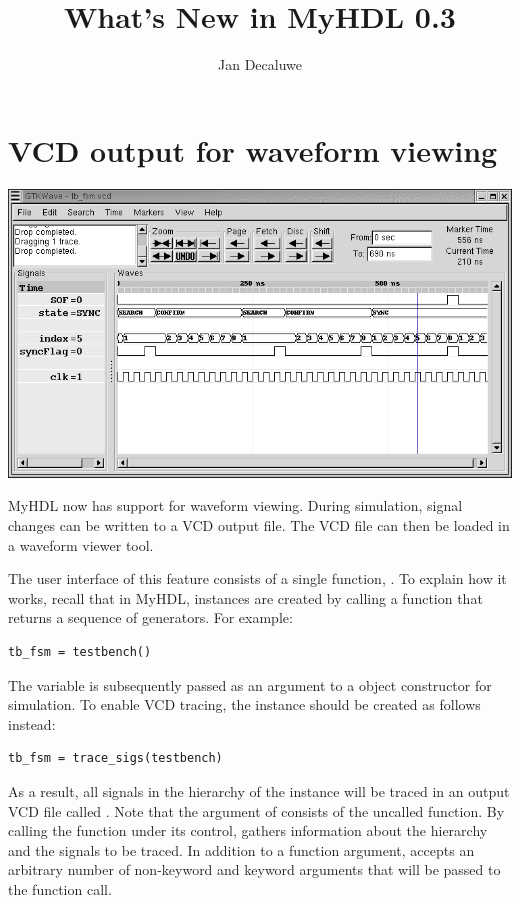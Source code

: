 \documentclass{howto}
\title{What's New in MyHDL 0.3}
\author{Jan Decaluwe}
\begin{document}
\maketitle
\tableofcontents


\section{VCD output for waveform viewing\label{section-wave}}

\ifpdf
\includegraphics{tbfsm.png}
\fi

MyHDL now has support for waveform viewing. During simulation, signal
changes can be written to a VCD output file.  The VCD file can then be
loaded in a waveform viewer tool.

The user interface of this feature consists of a single function,
.  To explain how it works, recall that in
MyHDL, instances are created by calling a function that returns a
sequence of generators. For example:

\begin{verbatim}
tb_fsm = testbench()
\end{verbatim}

The  variable is subsequently passed 
as an argument to a  object constructor
for simulation. To enable VCD tracing, the instance should 
be created as follows instead:

\begin{verbatim}
tb_fsm = trace_sigs(testbench)
\end{verbatim}

As a result, all signals in the hierarchy of the instance will be
traced in an output VCD file called . Note that the
argument of  consists of the uncalled
function. By calling the function under its control,
 gathers information about the hierarchy and
the signals to be traced.  In addition to a function argument,
 accepts an arbitrary number of non-keyword and
keyword arguments that will be passed to the function call.
\end{document}
